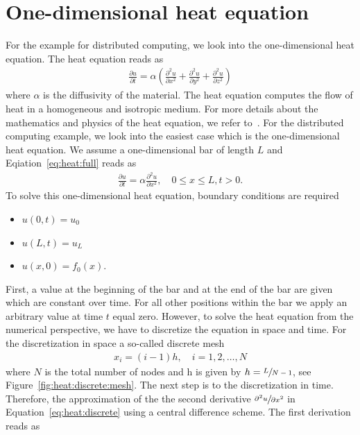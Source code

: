 \chapter{One-dimensional heat equation}
For the example for distributed computing, we look into the one-dimensional heat equation. The heat equation reads as
\begin{align}
\frac{\partial u}{\partial t} = \alpha \left( \frac{\partial^2 u }{\partial x^2} + \frac{\partial^2 u}{\partial y^2} + \frac{\partial^2 u}{\partial z^2} \right)
\label{eq:heat:full}
\end{align}
where $\alpha$ is the diffusivity of the material. The heat equation computes the flow of heat in a homogeneous and isotropic medium. For more details about the mathematics and physics of the heat equation, we refer to~\cite{cannon1984one}. For the distributed computing example, we look into the easiest case which is the one-dimensional heat equation. We assume a one-dimensional bar of length $L$ and Eqiation~\ref{eq:heat:full} reads as
\begin{align}
\frac{\partial u}{\partial t} = \alpha \frac{\partial^2 u}{\partial x^2}, \quad 0 \leq x \leq L, t >0.
\label{eq:heat:discrete}
\end{align}
To solve this one-dimensional heat equation, boundary conditions are required
\vspace{0.25cm}
\begin{itemize}
\item $u(0,t) = u_0$ 
\item $u(L,t) = u_L$
\item $u(x,0) = f_0(x)$.
\end{itemize}
\vspace{0.25cm}
First, a value at the beginning of the bar and at the end of the bar are given which are constant over time. For all other positions within the bar we apply an arbitrary value at time $t$ equal zero. However, to solve the heat equation from the numerical perspective, we have to discretize the equation in space and time. For the discretization in space a so-called discrete mesh 
\begin{align*}
x_i = (i-1) h, \quad i=1,2,\ldots,N
\end{align*}
where $N$ is the total number of nodes and h is given by $h=\sfrac{L}{N-1}$, see Figure~\ref{fig:heat:discrete:mesh}. The next step is to the discretization in time. Therefore, the approximation of the the second derivative $\sfrac{\partial^2 u}{\partial x^2}$ in Equation~\ref{eq:heat:discrete} using a central difference scheme. The first derivation reads as
